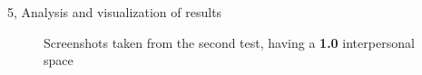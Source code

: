 \documentclass[10pt,a4paper]{article}
\begin{document}
\begin{task}{5, Analysis and visualization of results}
\begin{figure}[H]
    \centering
    \hfill
    \hfill
    \caption{Screenshots taken from the second test, having a \textbf{1.0} interpersonal space}
    \label{fig:5.3-2.1}
\end{figure}


\end{task}
\end{document}
